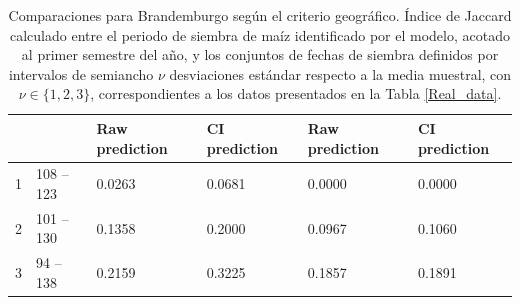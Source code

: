 \begin{table}[]
\begin{tabular}{llllll}
		\multicolumn{1}{l|}{}                                   & \multicolumn{1}{l|}{}                                                                                                         & \multicolumn{1}{l|}{\textbf{Raw prediction}} & \multicolumn{1}{l|}{\textbf{CI prediction}} & \multicolumn{1}{l|}{\textbf{Raw prediction}} & \textbf{CI prediction} \\ \hline
		\multicolumn{1}{l|}{1}                                  & \multicolumn{1}{l|}{108 -- 123}                                                                                               & \multicolumn{1}{l|}{0.0263}                  & \multicolumn{1}{l|}{0.0681}                 & \multicolumn{1}{l|}{0.0000}                  & 0.0000                 \\ \hline
		\multicolumn{1}{l|}{2}                                  & \multicolumn{1}{l|}{101 -- 130}                                                                                               & \multicolumn{1}{l|}{0.1358}                  & \multicolumn{1}{l|}{0.2000}                 & \multicolumn{1}{l|}{0.0967}                  & 0.1060                 \\ \hline
		\multicolumn{1}{l|}{3}                                  & \multicolumn{1}{l|}{94 -- 138}                                                                                                & \multicolumn{1}{l|}{0.2159}                  & \multicolumn{1}{l|}{0.3225}                 & \multicolumn{1}{l|}{0.1857}                  & 0.1891                 \\ \hline
	\end{tabular}
	\caption{Comparaciones para Brandemburgo según el criterio geográfico. Índice de Jaccard calculado entre el periodo de siembra de maíz identificado por el modelo, acotado al primer semestre del año, y los conjuntos de fechas de siembra definidos por intervalos de semiancho $\nu$ desviaciones estándar respecto a la media muestral, con $\nu\in\{1,2,3\}$, correspondientes a los datos presentados en la Tabla \ref{Real_data}.}
	\label{Tab:Comparions_Brandenburg_Geo}
\end{table}




